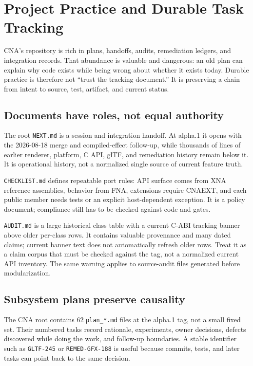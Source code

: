 \chapter{Project Practice and Durable Task Tracking}
\label{ch:project-practice}

CNA's repository is rich in plans, handoffs, audits, remediation ledgers, and integration records.
That abundance is valuable and dangerous: an old plan can explain why code exists while being
wrong about whether it exists today.  Durable practice is therefore not ``trust the tracking
document.''  It is preserving a chain from intent to source, test, artifact, and current status.

\section{Documents have roles, not equal authority}

The root \texttt{NEXT.md} is a session and integration handoff. At alpha.1 it opens with the
2026-08-18 merge and compiled-effect follow-up, while thousands of lines of earlier renderer,
platform, C API, glTF, and remediation history remain below it. It is operational history, not a
normalized single source of current feature truth.

\texttt{CHECKLIST.md} defines repeatable port rules: API surface comes from XNA reference
assemblies, behavior from FNA, extensions require CNAEXT, and each public member needs tests or an
explicit host-dependent exception.  It is a policy document; compliance still has to be checked
against code and gates.

\texttt{AUDIT.md} is a large historical class table with a current C-ABI tracking banner above
older per-class rows. It contains valuable provenance and many dated claims; current banner text
does not automatically refresh older rows. Treat it as a claim corpus that must be checked against
the tag, not a normalized current API inventory. The same warning applies to source-audit files
generated before modularization.

\section{Subsystem plans preserve causality}

The CNA root contains 62 \texttt{plan\_*.md} files at the alpha.1 tag, not a small fixed set. Their
numbered tasks record rationale, experiments, owner decisions, defects discovered while doing the
work, and follow-up boundaries.  A stable identifier such as \texttt{GLTF-245} or
\texttt{REMED-GFX-188} is useful because commits, tests, and later tasks can point back to the same
decision.

